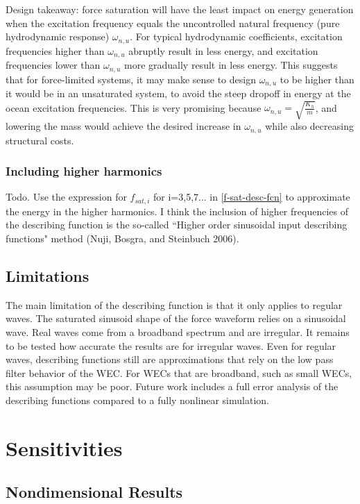 \documentclass{ifacconf}
\begin{document}
Design takeaway: force saturation will have the least impact on energy generation when the excitation frequency equals the uncontrolled natural frequency (pure hydrodynamic response) $\omega_{n,u}$. For typical hydrodynamic coefficients, excitation frequencies higher than $\omega_{n,u}$ abruptly result in less energy, and excitation frequencies lower than $\omega_{n,u}$ more gradually result in less energy. This suggests that for force-limited systems, it may make sense to design $\omega_{n,u}$ to be higher than it would be in an unsaturated system, to avoid the steep dropoff in energy at the ocean excitation frequencies. This is very promising because $\omega_{n,u} = \sqrt{\frac{K_h}{m}}$, and lowering the mass would achieve the desired increase in $\omega_{n,u}$ while also decreasing structural costs.

\subsubsection{Including higher harmonics}
Todo. Use the expression for $f_{sat,i}$ for i=3,5,7... in \eqref{f-sat-desc-fcn} to approximate the energy in the higher harmonics. I think the inclusion of higher frequencies of the describing function is the so-called ``Higher order sinusoidal input describing functions" method (Nuji, Bosgra, and Steinbuch 2006).

\subsection{Limitations}
The main limitation of the describing function is that it only applies to regular waves. The saturated sinusoid shape of the force waveform relies on a sinusoidal wave. Real waves come from a broadband spectrum and are irregular. It remains to be tested how accurate the results are for irregular waves. Even for regular waves, describing functions still are approximations that rely on the low pass filter behavior of the WEC. For WECs that are broadband, such as small WECs, this assumption may be poor. Future work includes a full error analysis of the describing functions compared to a fully nonlinear simulation.

\section{Sensitivities}\label{sec:sensitivities}
\subsection{Nondimensional Results}
\end{document}
